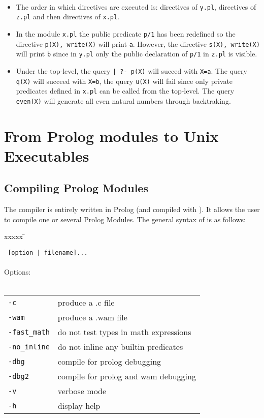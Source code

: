 ~\\

\begin{itemize}

\item The order in which directives are executed is: directives of
{\tt y.pl}, directives of {\tt z.pl} and then directives of {\tt x.pl}.

\item In the module {\tt x.pl} the public predicate {\tt p/1} has been
redefined so the directive {\tt p(X), write(X)} will print {\tt a}.
However, the directive {\tt s(X), write(X)} will print {\tt b} since
in {\tt y.pl} only the public declaration of {\tt p/1} in {\tt z.pl}
is visible.

\item Under the top-level, the query {\tt | ?- p(X)} will succed
with {\tt X=a}. The query {\tt q(X)} will succeed with {\tt X=b},
the query {\tt u(X)} will fail since only private predicates defined
in {\tt x.pl} can be called from the top-level. The query {\tt
even(X)} will generate all even natural numbers through backtraking.

\end{itemize}


\section{From Prolog modules to Unix Executables}

\subsection{Compiling Prolog Modules}

The {\wamcc} compiler is entirely written in {\wamcc} Prolog (and
compiled with {\wamcc}). It allows the user to compile one or several
Prolog Modules. The  general syntax of {\wamcc} is as follows:\\


\begin{tabbing}
xxxxx \= \kill

\> {\tt {\wamcc} [option | filename]...} \\
\> \\
\> Options:\\
\> \\
\> \begin{tabular}{ll}
{\tt -c}          & produce a .c   file 		 \\
{\tt -wam}        & produce a .wam file			 \\
{\tt -fast\_math} & do not test types in math expressions\\
{\tt -no\_inline} & do not inline any builtin predicates \\
{\tt -dbg}        & compile for prolog debugging	 \\
{\tt -dbg2}       & compile for prolog and wam debugging \\
{\tt -v}          & verbose mode			 \\
{\tt -h}          & display help			 \\
\end{tabular}

\end{tabbing}


